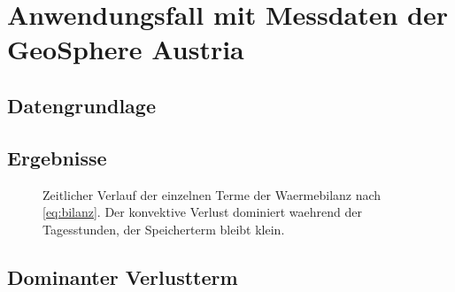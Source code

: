 \section{Anwendungsfall mit Messdaten der GeoSphere Austria}
\label{sec:anwendungsfall}


\subsection{Datengrundlage}


\subsection{Ergebnisse}

\begin{figure}[htbp]
  \centering
  \caption{Zeitlicher Verlauf der einzelnen Terme der Waermebilanz nach
           \cref{eq:bilanz}. Der konvektive Verlust dominiert waehrend der
           Tagesstunden, der Speicherterm bleibt klein.}
  \label{fig:bilanz}
\end{figure}

\subsection{Dominanter Verlustterm}

